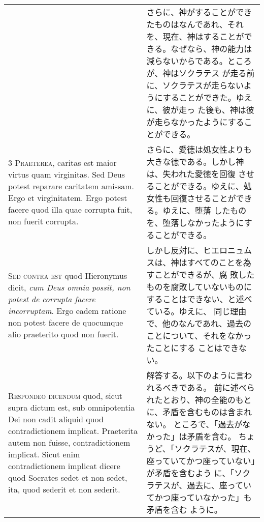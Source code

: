 \documentclass[10pt]{jsarticle} %
\begin{document}
\begin{longtable}{p{21em}p{21em}}
&

さらに、神がすることができたものはなんであれ、それを、現在、神はすることがで
 きる。なぜなら、神の能力は減らないからである。ところが、神はソクラテス
 が走る前に、ソクラテスが走らないようにすることができた。ゆえに、彼が走っ
 た後も、神は彼が走らなかったようにすることができる。



\\


{\scshape 3 Praeterea}, caritas est maior virtus quam
virginitas. Sed Deus potest reparare caritatem amissam. Ergo et
virginitatem. Ergo potest facere quod illa quae corrupta fuit, non
fuerit corrupta.


&

さらに、愛徳は処女性よりも大きな徳である。しかし神は、失われた愛徳を回復
させることができる。ゆえに、処女性も回復させることができる。ゆえに、堕落
したものを、堕落しなかったようにすることができる。

\\


{\scshape Sed contra est} quod Hieronymus dicit, {\itshape cum
Deus omnia possit, non potest de corrupta facere incorruptam}. Ergo eadem
ratione non potest facere de quocumque alio praeterito quod non fuerit.


&


しかし反対に、ヒエロニュムスは、神はすべてのことを為すことができるが、腐
敗したものを腐敗していないものにすることはできない、と述べている。ゆえに、
同じ理由で、他のなんであれ、過去のことについて、それをなかったことにする
 ことはできない。

\\


{\scshape Respondeo dicendum} quod, sicut supra dictum
est, sub omnipotentia Dei non cadit aliquid quod contradictionem
implicat. Praeterita autem non fuisse, contradictionem implicat. Sicut
enim contradictionem implicat dicere quod Socrates sedet et non sedet,
ita, quod sederit et non sederit. 


&

解答する。以下のように言われるべきである。
前に述べられたとおり、神の全能のもとに、矛盾を含むものは含まれない。
ところで、「過去がなかった」は矛盾を含む。
ちょうど、「ソクラテスが、現在、座っていてかつ座っていない」が矛盾を含むよう
に、「ソクラテスが、過去に、座っていてかつ座っていなかった」も矛盾を含む
ように。



\\



\end{longtable}
\end{document}
